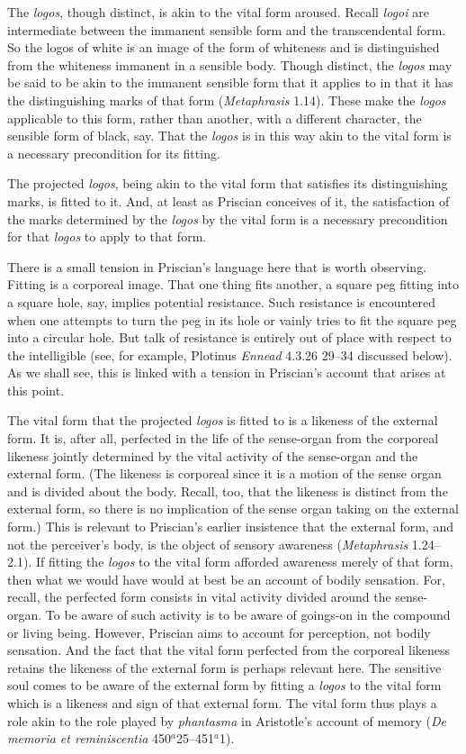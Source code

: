\documentclass[12pt]{article}
\begin{document}
The \emph{logos}, though distinct, is akin to the vital form aroused. Recall \emph{logoi} are intermediate between the immanent sensible form and the transcendental form. So the logos of white is an image of the form of whiteness and is distinguished from the whiteness immanent in a sensible body. Though distinct, the \emph{logos} may be said to be akin to the immanent sensible form that it applies to in that it has the distinguishing marks of that form (\emph{Metaphrasis} 1.14). These make the \emph{logos} applicable to this form, rather than another, with a different character, the sensible form of black, say. That the \emph{logos} is in this way akin to the vital form is a necessary precondition for its fitting.

The projected \emph{logos}, being akin to the vital form that satisfies its distinguishing marks, is fitted to it. And, at least as Priscian conceives of it, the satisfaction of the marks determined by the \emph{logos} by the vital form is a necessary precondition for that \emph{logos} to apply to that form.  

There is a small tension in Priscian's language here that is worth observing. Fitting is a corporeal image. That one thing fits another, a square peg fitting into a square hole, say, implies potential resistance. Such resistance is encountered when one attempts to turn the peg in its hole or vainly tries to fit the square peg into a circular hole. But talk of resistance is entirely out of place with respect to the intelligible (see, for example, Plotinus \emph{Ennead} 4.3.26 29–34 discussed below). As we shall see, this is linked with a tension in Priscian's account that arises at this point.

The vital form that the projected \emph{logos} is fitted to is a likeness of the external form. It is, after all, perfected in the life of the sense-organ from the corporeal likeness jointly determined by the vital activity of the sense-organ and the external form. (The likeness is corporeal since it is a motion of the sense organ and is divided about the body. Recall, too, that the likeness is distinct from the external form, so there is no implication of the sense organ taking on the external form.) This is relevant to Priscian's earlier insistence that the external form, and not the perceiver's body, is the object of sensory awareness (\emph{Metaphrasis} 1.24--2.1). If fitting the \emph{logos} to the vital form afforded awareness merely of that form, then what we would have would at best be an account of bodily sensation. For, recall, the perfected form consists in vital activity divided around the sense-organ. To be aware of such activity is to be aware of goings-on in the compound or living being. However, Priscian aims to account for perception, not bodily sensation. And the fact that the vital form perfected from the corporeal likeness retains the likeness of the external form is perhaps relevant here. The sensitive soul comes to be aware of the external form by fitting a \emph{logos} to the vital form which is a likeness and sign of that external form. The vital form thus plays a role akin to the role played by \emph{phantasma} in Aristotle's account of memory (\emph{De memoria et reminiscentia} 450\( ^{a} \)25–451\( ^{a} \)1).
\end{document}
